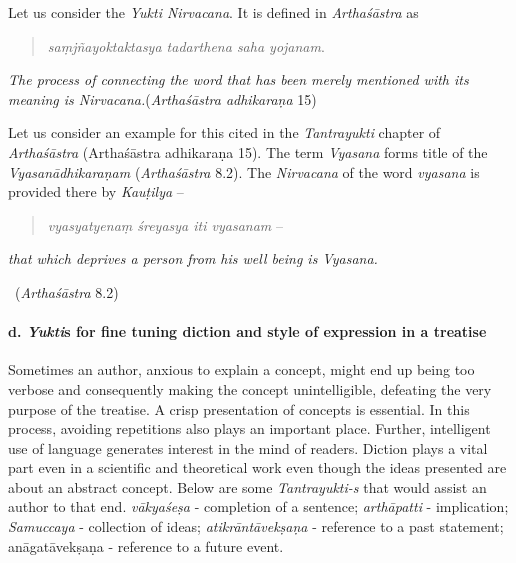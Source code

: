 Let us consider the \textit{Yukti Nirvacana}. It is defined in \textit{Arthaśāstra} as

\begin{quote}
\textit{saṃjñayoktaktasya tadarthena saha yojanam}.
\end{quote}

\begin{myquote}
\textit{The process of connecting the word that has been merely mentioned with its meaning is Nirvacana.}\hfill (\textit{Arthaśāstra adhikaraṇa} 15)
\end{myquote}

Let us consider an example for this cited in the \textit{Tantrayukti} chapter of \textit{Arthaśāstra} (Arthaśāstra adhikaraṇa 15). The term \textit{Vyasana} forms title of the \textit{Vyasanādhikaraṇam} (\textit{Arthaśāstra} 8.2). The \textit{Nirvacana} of the word \textit{vyasana} is provided there by \textit{Kauṭilya} –

\begin{verse}
\textit{vyasyatyenaṃ śreyasya iti vyasanam} –
\end{verse}

\begin{myquote}
\textit{that which deprives a person from his well being is Vyasana.}

~\hfill (\textit{Arthaśāstra} 8.2)
\end{myquote}


\paragraph*{d. \textit{Yukti}s for fine tuning diction and style of expression in a treatise}

Sometimes an author, anxious to explain a concept, might end up being too verbose and consequently making the concept unintelligible, defeating the very purpose of the treatise. A crisp presentation of concepts is essential. In this process, avoiding repetitions also plays an important place. Further, intelligent use of language generates interest in the mind of readers. Diction plays a vital part even in a scientific and theoretical work even though the ideas presented are about an abstract concept. Below are some \textit{Tantrayukti-s} that would assist an author to that end. \textit{vākyaśeṣa} - completion of a sentence; \textit{arthāpatti} - implication; \textit{Samuccaya} - collection of ideas; \textit{atikrāntāvekṣaṇa} - reference to a past statement; anāgatāvekṣaṇa - reference to a future event.

